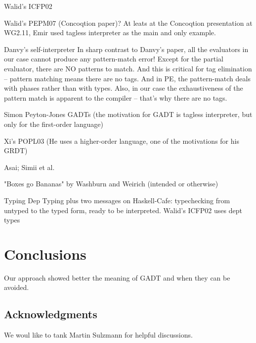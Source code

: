 \documentclass[preprint]{sigplanconf}
\begin{document}
Walid's ICFP02

Walid's PEPM07 (Concoqtion paper)? At leats at the Concoqtion
presentation at WG2.11, Emir used tagless interpreter as the main and
only example.

Danvy's self-interpreter
In sharp contrast to Danvy's paper, all the evaluators in our case
cannot produce any pattern-match error! Except for the partial
evaluator, there are NO patterns to match. And this is critical for
tag elimination -- pattern matching means there are no tags. And in
PE, the pattern-match deals with phases rather than with types. Also,
in our case the exhaustiveness of the pattern match is apparent to the
compiler -- that's why there are no tags.

Simon Peyton-Jones GADTs (the motivation for GADT is tagless
interpreter, but only for the first-order language)

Xi's POPL03 (He uses a higher-order language, one of the motivations
for his GRDT)

Asai; Simii et al.

"Boxes go Bananas" by Washburn and Weirich (intended or otherwise)


Typing Dep Typing plus two messages on Haskell-Cafe: typechecking 
from untyped to the typed form, ready to be interpreted. Walid's ICFP02
uses dept types


\section{Conclusions}

Our approach showed better the meaning of GADT and when they can be
avoided.

\subsection*{Acknowledgments}
We woul like to tank Martin Sulzmann for helpful discussions.
\end{document}
